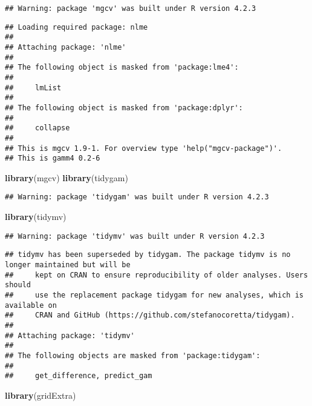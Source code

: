 \documentclass[
]{article}
\newenvironment{Shaded}{\begin{snugshade}}{\end{snugshade}}
\newcommand{\FunctionTok}[1]{\textcolor[rgb]{0.13,0.29,0.53}{\textbf{#1}}}
\newcommand{\NormalTok}[1]{#1}
\begin{document}
\begin{verbatim}
## Warning: package 'mgcv' was built under R version 4.2.3
\end{verbatim}

\begin{verbatim}
## Loading required package: nlme
## 
## Attaching package: 'nlme'
## 
## The following object is masked from 'package:lme4':
## 
##     lmList
## 
## The following object is masked from 'package:dplyr':
## 
##     collapse
## 
## This is mgcv 1.9-1. For overview type 'help("mgcv-package")'.
## This is gamm4 0.2-6
\end{verbatim}

\begin{Shaded}
\begin{Highlighting}[]
\FunctionTok{library}\NormalTok{(mgcv)}
\FunctionTok{library}\NormalTok{(tidygam)}
\end{Highlighting}
\end{Shaded}

\begin{verbatim}
## Warning: package 'tidygam' was built under R version 4.2.3
\end{verbatim}

\begin{Shaded}
\begin{Highlighting}[]
\FunctionTok{library}\NormalTok{(tidymv)}
\end{Highlighting}
\end{Shaded}

\begin{verbatim}
## Warning: package 'tidymv' was built under R version 4.2.3
\end{verbatim}

\begin{verbatim}
## tidymv has been superseded by tidygam. The package tidymv is no longer maintained but will be
##     kept on CRAN to ensure reproducibility of older analyses. Users should
##     use the replacement package tidygam for new analyses, which is available on
##     CRAN and GitHub (https://github.com/stefanocoretta/tidygam).
## 
## Attaching package: 'tidymv'
## 
## The following objects are masked from 'package:tidygam':
## 
##     get_difference, predict_gam
\end{verbatim}

\begin{Shaded}
\begin{Highlighting}[]
\FunctionTok{library}\NormalTok{(gridExtra)}
\end{Highlighting}
\end{Shaded}
\end{document}
